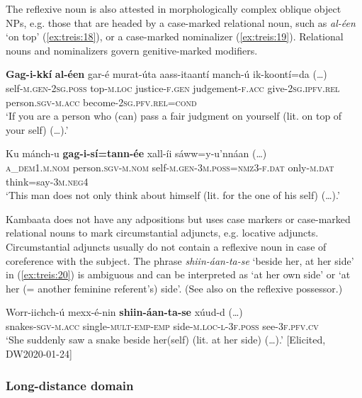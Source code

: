 \documentclass[output=paper]{langscibook}
\begin{document}
The reflexive noun is also attested in morphologically complex oblique object NPs, e.g. those that are headed by a case-marked relational noun, such as \textit{al-éen} ‘on top’ (\ref{ex:treis:18}), or a case-marked nominalizer (\ref{ex:treis:19}). Relational nouns and nominalizers govern genitive-marked modifiers.

\ea\label{ex:treis:18} 
\gll \textbf{Gag-i-kkí} \textbf{al-éen} gar-é murat-úta aass-itaantí manch-ú {ik-koontí=da (…)}\\
     self-\textsc{m.gen-2sg.poss} top-\textsc{m.loc} justice-\textsc{f.gen} judgement-\textsc{f.acc} give-\textsc{2sg.ipfv.rel} person.\textsc{sgv-m.acc} become-\textsc{2sg.pfv.rel=cond}\\
\glt ‘If you are a person who (can) pass a fair judgment on yourself (lit. on top of your self) (…).’ \citep[40]{Saint-Exupéry2018}\z

\ea\label{ex:treis:19} 
\gll Ku mánch-u \textbf{gag-i-sí=tann-ée} xall-íi {sáww=y-u’nnáan (…)}\\
     \textsc{a\_dem1.m.nom} person.\textsc{sgv-m.nom} self-\textsc{m.gen-3m.poss=nmz3-f.dat} only-\textsc{m.dat} think=say-\textsc{3m.neg4}\\
\glt ‘This man does not only think about himself (lit. for the one of his self) (…).’ \citep[52]{Saint-Exupéry2018}\z

Kambaata does not have any adpositions but uses case markers or case-marked relational nouns to mark circumstantial adjuncts, e.g. locative adjuncts. Circumstantial adjuncts usually do not contain a reflexive noun in case of coreference with the subject. The phrase \textit{shiin-áan-ta-se} ‘beside her, at her side’ in (\ref{ex:treis:20}) is ambiguous and can be interpreted as ‘at her own side’ or ‘at her (= another feminine referent’s) side’. (See also  on the reflexive possessor.)

\ea\label{ex:treis:20} 
\gll Worr-iichch-ú mexx-é-nin \textbf{shiin-áan-ta-se} {xúud-d (…)}\\
     snakes-\textsc{sgv-m.acc} single-\textsc{mult-emp-emp} side-\textsc{m.loc-l-3f.poss} see-\textsc{3f.pfv.cv}\\
\glt ‘She suddenly saw a snake beside her(self) (lit. at her side) (…).’ [Elicited, DW2020-01-24]\z

\subsubsection{Long-distance domain}\label{sec:treis:3.2.3}
\end{document}
